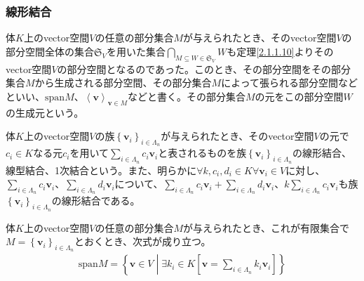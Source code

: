 \documentclass[dvipdfmx]{jsarticle}
\begin{document}
\subsubsection{線形結合}%
\begin{dfn}
体$K$上のvector空間$V$の任意の部分集合$M$が与えられたとき、そのvector空間$V$の部分空間全体の集合$\mathfrak{S}_{V}$を用いた集合$\bigcap_{M\subseteq W\in \mathfrak{S}_{V} } W$も定理\ref{2.1.1.10}よりそのvector空間$V$の部分空間となるのであった。このとき、その部分空間をその部分集合$M$から生成される部分空間、その部分集合$M$によって張られる部分空間などといい、${\mathrm{span}}M$、$\left\langle \mathbf{v} \right\rangle_{\mathbf{v} \in M}$などと書く。その部分集合$M$の元をこの部分空間$W$の生成元という。
\end{dfn}
\begin{dfn}
体$K$上のvector空間$V$の族$\left\{ \mathbf{v}_i \right\}_{i\in \varLambda_n} $が与えられたとき、そのvector空間$V$の元で$c_i \in K$なる元$c_i $を用いて$\sum_{i \in \varLambda_{n}} {c_{i}\mathbf{v}_{i}}$と表されるものを族$\left\{ \mathbf{v}_i \right\}_{i\in \varLambda_n } $の線形結合、線型結合、1次結合という。また、明らかに$\forall k,c_{i},d_{i} \in K\forall\mathbf{v}_{i} \in V$に対し、$\sum_{i \in \varLambda_{n}} {c_{i}\mathbf{v}_{i}}$、$\sum_{i \in \varLambda_{n}} {d_{i}\mathbf{v}_{i}}$について、$\sum_{i \in \varLambda_{n}} {c_{i}\mathbf{v}_{i}} + \sum_{i \in \varLambda_{n}} {d_{i}\mathbf{v}_{i}}$、$k\sum_{i \in \varLambda_{n}} {c_{i}\mathbf{v}_{i}}$も族$\left\{ \mathbf{v}_i \right\}_{i\in \varLambda_n } $の線形結合である。
\end{dfn}
\begin{thm}\label{2.1.1.11}
体$K$上のvector空間$V$の任意の部分集合$M$が与えられたとき、これが有限集合で$M = \left\{ \mathbf{v}_{i} \right\}_{i \in \varLambda_{n}}$とおくとき、次式が成り立つ。
\begin{align*}
{\mathrm{span}}M = \left\{ \mathbf{v} \in V \middle| \exists k_{i} \in K\left\lbrack \mathbf{v} = \sum_{i \in \varLambda_{n}} {k_{i}\mathbf{v}_{i}} \right\rbrack \right\}
\end{align*}
\end{thm}
\end{document}
